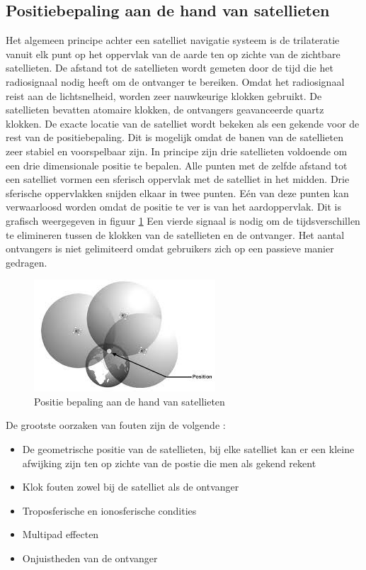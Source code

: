 \subsection{Positiebepaling aan de hand van satellieten}
\label{LPbS}
Het algemeen principe achter een satelliet navigatie systeem is de trilateratie vanuit elk punt op het oppervlak van de aarde ten op zichte van de zichtbare satellieten.  De afstand tot de satellieten wordt gemeten door de tijd die het radiosignaal nodig heeft om de ontvanger te bereiken. Omdat het radiosignaal reist aan de lichtsnelheid, worden zeer nauwkeurige klokken gebruikt. De satellieten bevatten atomaire klokken, de ontvangers geavanceerde quartz klokken. De exacte locatie van de satelliet wordt bekeken als een gekende voor de rest van de positiebepaling. Dit is mogelijk omdat de banen van de satellieten zeer stabiel en voorspelbaar zijn. In principe zijn drie satellieten voldoende om een drie dimensionale positie te bepalen. Alle punten met de zelfde afstand tot een satelliet vormen een sferisch oppervlak met de satelliet in het midden. Drie sferische oppervlakken snijden elkaar in twee punten. E\'en van deze punten kan verwaarloosd worden omdat de positie te ver is van het aardoppervlak. Dit is grafisch weergegeven in figuur \ref{imgPbS} Een vierde signaal is nodig om de tijdsverschillen te elimineren tussen de klokken van de satellieten en de ontvanger. Het aantal ontvangers is niet gelimiteerd omdat gebruikers zich op een passieve manier gedragen. 
\begin{figure}[hpb]
	\includegraphics[scale=1.75]{BepalingPositie.jpg}
	\caption{Positie bepaling aan de hand van satellieten \cite{LBibSat}}
	\label{imgPbS}
\end{figure} 
De grootste oorzaken van fouten zijn de volgende \cite{LBibGNSS8}:
\begin{itemize}
	\item De geometrische positie van de satellieten, bij elke satelliet kan er een kleine afwijking zijn ten op zichte van de postie die men als gekend rekent
	\item Klok fouten zowel bij de satelliet als de ontvanger
	\item Troposferische en ionosferische condities
	\item Multipad effecten
	\item Onjuistheden van de ontvanger
\end{itemize}

